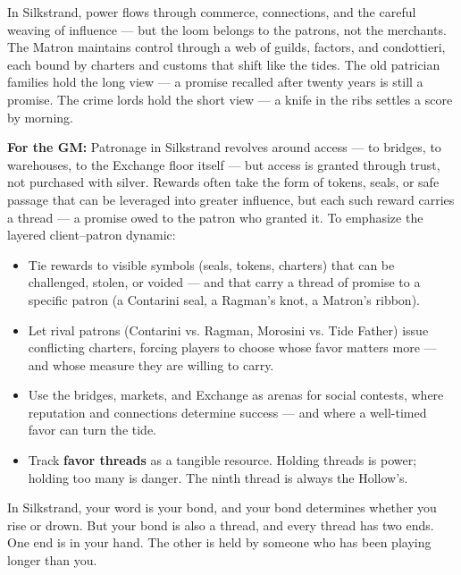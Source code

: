 \begin{tcolorbox}[colback=black!3,colframe=black!40!white,title={Patronage \& Power},breakable]
In Silkstrand, power flows through commerce, connections, and the careful weaving of influence --- but the loom belongs to the patrons, not the merchants. The Matron maintains control through a web of guilds, factors, and condottieri, each bound by charters and customs that shift like the tides. The old patrician families hold the long view --- a promise recalled after twenty years is still a promise. The crime lords hold the short view --- a knife in the ribs settles a score by morning.

\textbf{For the GM:}  
Patronage in Silkstrand revolves around access --- to bridges, to warehouses, to the Exchange floor itself --- but access is granted through trust, not purchased with silver. Rewards often take the form of tokens, seals, or safe passage that can be leveraged into greater influence, but each such reward carries a thread --- a promise owed to the patron who granted it. To emphasize the layered client--patron dynamic:
\begin{itemize}
\item Tie rewards to visible symbols (seals, tokens, charters) that can be challenged, stolen, or voided --- and that carry a thread of promise to a specific patron (a Contarini seal, a Ragman's knot, a Matron's ribbon).
\item Let rival patrons (Contarini vs. Ragman, Morosini vs. Tide Father) issue conflicting charters, forcing players to choose whose favor matters more --- and whose measure they are willing to carry.
\item Use the bridges, markets, and Exchange as arenas for social contests, where reputation and connections determine success --- and where a well-timed favor can turn the tide.
\item Track \textbf{favor threads} as a tangible resource. Holding threads is power; holding too many is danger. The ninth thread is always the Hollow's.
\end{itemize}
In Silkstrand, your word is your bond, and your bond determines whether you rise or drown. But your bond is also a thread, and every thread has two ends. One end is in your hand. The other is held by someone who has been playing longer than you.
\end{tcolorbox}

